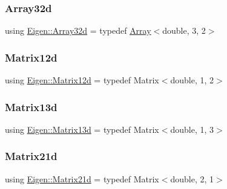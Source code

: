 \mbox{\label{namespaceEigen_a5035244c17b9361d1a3a2ff9e6abe744}} 
\subsubsection{\texorpdfstring{Array32d}{Array32d}}
{\footnotesize\ttfamily using \hyperlink{namespaceEigen_a5035244c17b9361d1a3a2ff9e6abe744}{Eigen\+::\+Array32d} = typedef \hyperlink{Includes_8h_abd9de33944f934950000c3929e14ad8d}{Array}$<$double, 3, 2$>$}

\mbox{\label{namespaceEigen_a275c6f0ba3c6575f4c8cd8e229866654}} 
\subsubsection{\texorpdfstring{Matrix12d}{Matrix12d}}
{\footnotesize\ttfamily using \hyperlink{namespaceEigen_a275c6f0ba3c6575f4c8cd8e229866654}{Eigen\+::\+Matrix12d} = typedef Matrix$<$double, 1, 2$>$}

\mbox{\label{namespaceEigen_a212f6d493e3c7168dafacfc1c93b09df}} 
\subsubsection{\texorpdfstring{Matrix13d}{Matrix13d}}
{\footnotesize\ttfamily using \hyperlink{namespaceEigen_a212f6d493e3c7168dafacfc1c93b09df}{Eigen\+::\+Matrix13d} = typedef Matrix$<$double, 1, 3$>$}

\mbox{\label{namespaceEigen_a6d712066fa86ab18ae218970bd3c93d3}} 
\subsubsection{\texorpdfstring{Matrix21d}{Matrix21d}}
{\footnotesize\ttfamily using \hyperlink{namespaceEigen_a6d712066fa86ab18ae218970bd3c93d3}{Eigen\+::\+Matrix21d} = typedef Matrix$<$double, 2, 1$>$}

\mbox{\label{namespaceEigen_a6b59c2ed598454edf0ba0b2be5487582}} 
